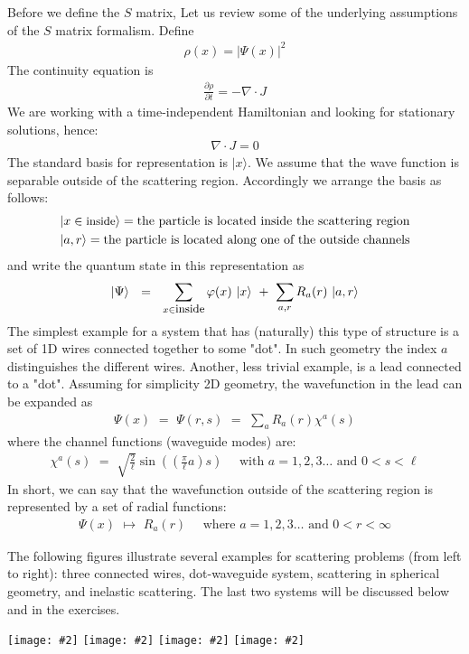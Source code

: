 \documentclass[onecolumn,fleqn]{revtex4}
\newcommand{\putgraph}[2][0.30\hsize]{\texttt{[image: \#2]}}
\newcommand{\beq}{\begin{eqnarray}}
\newcommand{\eeq}{\end{eqnarray}}
\begin{document}
Before we define the $S$ matrix, Let us review 
some of the underlying assumptions of the $S$ matrix 
formalism. Define 
\beq
\rho(x) = {| \Psi (x)| }^{2} 
\eeq
The continuity equation is
\beq
\frac{\partial\rho}{\partial{t}} = -{\nabla\cdot{J}} 
\eeq
We are working with a time-independent Hamiltonian 
and looking for stationary solutions, hence: 
\beq
\nabla\cdot{J}=0 
\eeq
The standard basis for representation is ${|x\rangle}$. 
We assume that the wave function is separable outside 
of the scattering region. Accordingly we arrange the basis as follows:
\beq
|x \in \mbox{\small inside} \rangle = \mbox{the particle is located inside the scattering region}
\\ \nonumber
|a,r\rangle = \mbox{the particle is located along one of the outside channels}
\eeq
and write the quantum state in this representation as 
\beq
|\Psi\rangle \ \ = \ \ 
\sum_{x \in \mbox{\small inside}} \varphi(x) \ |x\rangle
\ + \ \sum_{a,r} R_a(r) \ |a,r\rangle
\eeq
The simplest example for a system that has (naturally) this type 
of structure is a set of 1D wires connected together to some "dot".  
In such geometry the index $a$ distinguishes the different wires. 
Another, less trivial example, is a lead connected to a "dot". 
Assuming for simplicity 2D geometry, the wavefunction 
in the lead can be expanded as 
\beq
\Psi(x) \,\,=\,\, 
\Psi(r,s) \,\,=\,\, \sum_a R_a(r) \chi^a(s) 
\eeq
where the channel functions (waveguide modes) are:
\beq
\chi^a(s) \,\,=\,\,
\sqrt{\frac{2}{\ell}}\sin\left(\left(\frac{\pi}{\ell}a\right)s\right) 
\ \ \ \ \ \ \mbox{with $a=1,2,3 \dots $ and $0<s<\ell$} 
\eeq
In short, we can say that the wavefunction outside 
of the scattering region is represented by a set of radial functions:
\beq
\Psi(x) \,\, \mapsto \,\, R_a(r) 
\ \ \ \ \ \ \mbox{where $a=1,2,3 \dots $ and $0<r<\infty$}
\eeq

The following figures illustrate several examples 
for scattering problems (from left to right): three connected wires, 
dot-waveguide system, scattering in spherical 
geometry, and inelastic scattering. 
The last two systems will be discussed 
below and in the exercises. 


\begin{center}
\putgraph[0.1\hsize]{ThreeWires.jpg} 
\hspace{0.06\hsize}
\putgraph[0.2\hsize]{DotWaveGuide} 
\hspace{0.06\hsize}
\putgraph[0.2\hsize]{ScatteringSphericalGeometry} 
\hspace{0.06\hsize}
\putgraph[0.25\hsize]{InelasticScattering} 
\end{center}
\end{document}
